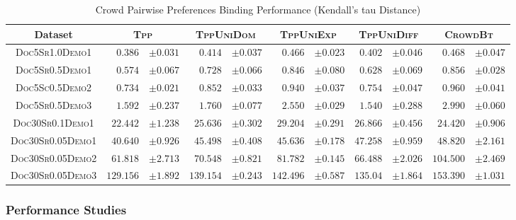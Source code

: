 \begin{table}[t]
\caption{Crowd Pairwise Preferences Binding Performance
          (Kendall's tau Distance)}
\label{tab::sim_binding}
\setlength\tabcolsep{1.5pt}
\begin{center}
\begin{tabular}{c|rl|rl|rl|rl|rl}
\hline \hline
Dataset	&	\multicolumn{2}{c|}{\textsc{Tpp}}
        &	\multicolumn{2}{|c|}{\textsc{TppUniDom}}
        & \multicolumn{2}{|c|}{\textsc{TppUniExp}}
        & \multicolumn{2}{|c}{\textsc{TppUniDiff}}
        & \multicolumn{2}{|c}{\textsc{CrowdBt}} \\ \hline \hline
\textsc{Doc5Sr1.0Demo1}		& $\mathbf{0.386}$	&	$\pm0.031$	&	$0.414$
        &	$\pm0.037$	&	$0.466$	&	$\pm0.023$	&	$0.402$	&	$\pm0.046$
				& $0.468$	&	$\pm0.047$\\
\textsc{Doc5Sr0.5Demo1} 	& $\mathbf{0.574}$	&	$\pm0.067$	&	$0.728$
        &	$\pm0.066$	&	$0.846$	&	$\pm0.080$	&	$0.628$	&	$\pm0.069$
			  & $0.856$	&	$\pm0.028$\\
\textsc{Doc5Sc0.5Demo2} 	& $\mathbf{0.734}$	&	$\pm0.021$	&	$0.852$
        &	$\pm0.033$	&	$0.940$	&	$\pm0.037$	&	$0.754$	&	$\pm0.047$
			  & $0.960$	&	$\pm0.041$\\
\textsc{Doc5Sr0.5Demo3} 	& $1.592$	&	$\pm0.237$	&	$1.760$	&	$\pm0.077$
        &	$2.550$	&	$\pm0.029$	&	$\mathbf{1.540}$	&	$\pm0.288$
			  & $2.990$	&	$\pm0.060$\\ \hline
\textsc{Doc30Sr0.1Demo1} 	& $\mathbf{22.442}$	&	$\pm1.238$	&	$25.636$
        & $\pm0.302$	&	$29.204$&	$\pm0.291$	&	$26.866$&	$\pm0.456$
			  & $24.420$	& $\pm0.906$\\
\textsc{Doc30Sr0.05Demo1} 	& $\mathbf{40.640}$	&	$\pm0.926$	&	$45.498$
        &	$\pm0.408$	&	$45.636$&	$\pm0.178$	&	$47.258$&	$\pm0.959$
			  & $48.820$	& $\pm2.161$\\
\textsc{Doc30Sr0.05Demo2} 	& $\mathbf{61.818}$	&	$\pm2.713$	&	$70.548$
        &	$\pm0.821$	&	$81.782$&	$\pm0.145$	&	$66.488$&	$\pm2.026$
			  & $104.500$	& $\pm2.469$\\
\textsc{Doc30Sr0.05Demo3} 	& $\mathbf{129.156}$	&	$\pm1.892$	&	$139.154$
        &	$\pm0.243$	&	$142.496$&	$\pm0.587$	&	$135.04$&	$\pm1.864$
			  & $153.390$	& $\pm1.031$ \\ \hline\hline
\end{tabular}
\end{center}
\end{table}%

\subsubsection{Performance Studies}


